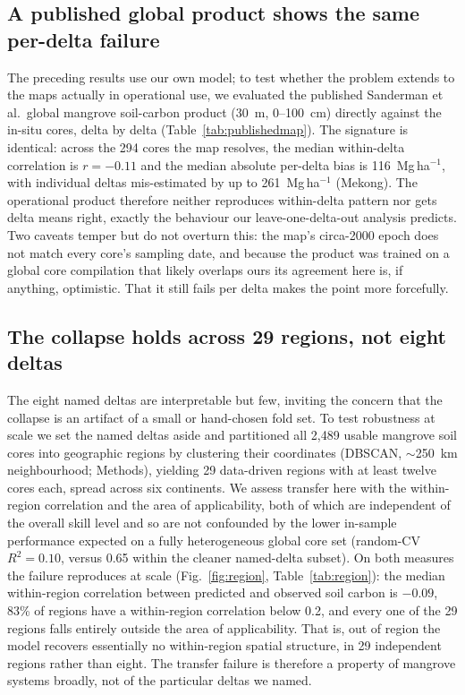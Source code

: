\documentclass[twocolumn,9pt]{extarticle}
\begin{document}
\subsection*{A published global product shows the same per-delta failure}
The preceding results use our own model; to test whether the problem extends to the maps
actually in operational use, we evaluated the published Sanderman et al.\ global mangrove
soil-carbon product (30~m, 0--100~cm) directly against the in-situ cores, delta by delta
(Table~\ref{tab:publishedmap}). The signature is identical: across the 294 cores the map
resolves, the median within-delta correlation is $r=-0.11$ and the median absolute
per-delta bias is 116~Mg\,ha$^{-1}$, with individual deltas mis-estimated by up to
261~Mg\,ha$^{-1}$ (Mekong). The operational product therefore neither reproduces
within-delta pattern nor gets delta means right, exactly the behaviour our
leave-one-delta-out analysis predicts. Two caveats temper but do not overturn this: the
map's circa-2000 epoch does not match every core's sampling date, and because the
product was trained on a global core compilation that likely overlaps ours its agreement
here is, if anything, optimistic. That it still fails per delta makes the point more
forcefully.

\begin{table}[t]
\centering
\caption{The published Sanderman et al.\ mangrove SOC map evaluated against in-situ cores
per delta: number of cores resolved, median observed and mapped SOC, mean bias, and
within-delta correlation.}
\label{tab:publishedmap}

\end{table}

\subsection*{The collapse holds across 29 regions, not eight deltas}
The eight named deltas are interpretable but few, inviting the concern that the collapse
is an artifact of a small or hand-chosen fold set. To test robustness at scale we set
the named deltas aside and partitioned all 2{,}489 usable mangrove soil cores into
geographic regions by clustering their coordinates (DBSCAN, $\sim$250~km neighbourhood;
Methods), yielding 29 data-driven regions with at least twelve cores each, spread across
six continents. We assess transfer here with the within-region correlation and the
area of applicability, both of which are independent of the overall skill level and so
are not confounded by the lower in-sample performance expected on a fully heterogeneous
global core set (random-CV $R^2=0.10$, versus 0.65 within the cleaner named-delta subset).
On both measures the failure reproduces at scale (Fig.~\ref{fig:region},
Table~\ref{tab:region}): the median within-region correlation between predicted and
observed soil carbon is $-0.09$, 83\% of regions have a within-region correlation below
0.2, and every one of the 29 regions falls entirely outside the area of applicability.
That is, out of region the model recovers essentially no within-region spatial structure,
in 29 independent regions rather than eight. The transfer failure is therefore a property
of mangrove systems broadly, not of the
particular deltas we named.
\end{document}
